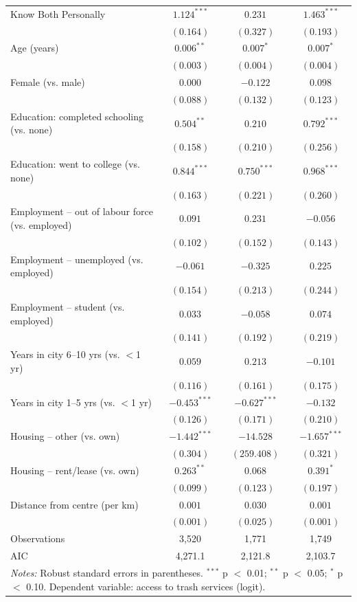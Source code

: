 \begin{table}[htbp]
\begin{tabular}{lccc}
Know Both Personally & $1.124^{***}$ & $0.231$ & $1.463^{***}$ \\
 & $(0.164)$ & $(0.327)$ & $(0.193)$ \\
Age (years) & $0.006^{**}$ & $0.007^{*}$ & $0.007^{*}$ \\
 & $(0.003)$ & $(0.004)$ & $(0.004)$ \\
Female (vs. male) & $0.000$ & $-0.122$ & $0.098$ \\
 & $(0.088)$ & $(0.132)$ & $(0.123)$ \\
Education: completed schooling (vs. none) & $0.504^{**}$ & $0.210$ & $0.792^{***}$ \\
 & $(0.158)$ & $(0.210)$ & $(0.256)$ \\
Education: went to college (vs. none) & $0.844^{***}$ & $0.750^{***}$ & $0.968^{***}$ \\
 & $(0.163)$ & $(0.221)$ & $(0.260)$ \\
Employment – out of labour force (vs. employed) & $0.091$ & $0.231$ & $-0.056$ \\
 & $(0.102)$ & $(0.152)$ & $(0.143)$ \\
Employment – unemployed (vs. employed) & $-0.061$ & $-0.325$ & $0.225$ \\
 & $(0.154)$ & $(0.213)$ & $(0.244)$ \\
Employment – student (vs. employed) & $0.033$ & $-0.058$ & $0.074$ \\
 & $(0.141)$ & $(0.192)$ & $(0.219)$ \\
Years in city 6–10 yrs (vs. $<$1 yr) & $0.059$ & $0.213$ & $-0.101$ \\
 & $(0.116)$ & $(0.161)$ & $(0.175)$ \\
Years in city 1–5 yrs (vs. $<$1 yr) & $-0.453^{***}$ & $-0.627^{***}$ & $-0.132$ \\
 & $(0.126)$ & $(0.171)$ & $(0.210)$ \\
Housing – other (vs. own) & $-1.442^{***}$ & $-14.528$ & $-1.657^{***}$ \\
 & $(0.304)$ & $(259.408)$ & $(0.321)$ \\
Housing – rent/lease (vs. own) & $0.263^{**}$ & $0.068$ & $0.391^{*}$ \\
 & $(0.099)$ & $(0.123)$ & $(0.197)$ \\
Distance from centre (per km) & $0.001$ & $0.030$ & $0.001$ \\
 & $(0.001)$ & $(0.025)$ & $(0.001)$ \\
\hline
Observations & 3,520 & 1,771 & 1,749 \\
AIC & 4,271.1 & 2,121.8 & 2,103.7 \\
\hline\hline
\multicolumn{4}{p{0.9\linewidth}}{\small \textit{Notes:} Robust standard errors in parentheses. $^{***}$ p $<$ 0.01; $^{**}$ p $<$ 0.05; $^{*}$ p $<$ 0.10. Dependent variable: access to trash services (logit).}\\
\end{tabular}
\end{table}

